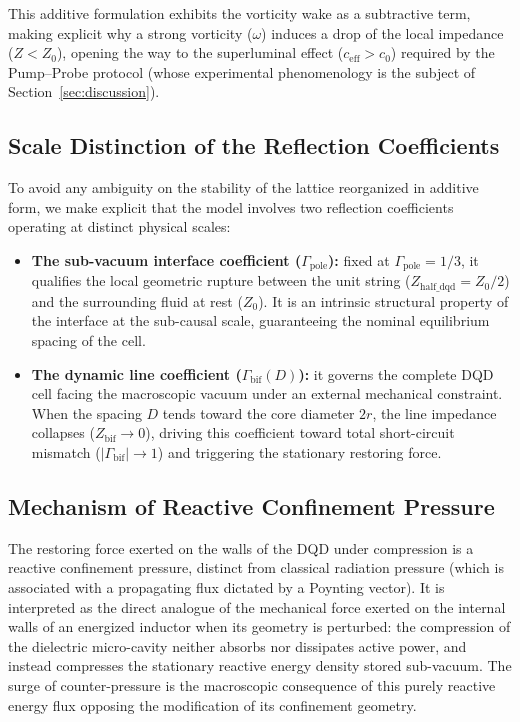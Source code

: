 \documentclass[11pt,a4paper]{article}
\theoremstyle{plain}
\theoremstyle{remark}
\begin{document}
This additive formulation exhibits the vorticity wake as a subtractive term, making explicit why a strong vorticity ($\omega$) induces a drop of the local impedance ($Z < Z_0$), opening the way to the superluminal effect ($c_{\text{eff}} > c_0$) required by the Pump--Probe protocol (whose experimental phenomenology is the subject of Section~\ref{sec:discussion}).

\subsection{Scale Distinction of the Reflection Coefficients}
To avoid any ambiguity on the stability of the lattice reorganized in additive form, we make explicit that the model involves two reflection coefficients operating at distinct physical scales:
\begin{itemize}
    \item \textbf{The sub-vacuum interface coefficient ($\Gamma_{\text{pole}}$):} fixed at $\Gamma_{\text{pole}} = 1/3$, it qualifies the local geometric rupture between the unit string ($Z_{\text{half\_dqd}} = Z_{0}/2$) and the surrounding fluid at rest ($Z_{0}$). It is an intrinsic structural property of the interface at the sub-causal scale, guaranteeing the nominal equilibrium spacing of the cell.
    \item \textbf{The dynamic line coefficient ($\Gamma_{\text{bif}}(D)$):} it governs the complete DQD cell facing the macroscopic vacuum under an external mechanical constraint. When the spacing $D$ tends toward the core diameter $2r$, the line impedance collapses ($Z_{\text{bif}} \rightarrow 0$), driving this coefficient toward total short-circuit mismatch ($|\Gamma_{\text{bif}}| \rightarrow 1$) and triggering the stationary restoring force.
\end{itemize}

\subsection{Mechanism of Reactive Confinement Pressure}
The restoring force exerted on the walls of the DQD under compression is a reactive confinement pressure, distinct from classical radiation pressure (which is associated with a propagating flux dictated by a Poynting vector). It is interpreted as the direct analogue of the mechanical force exerted on the internal walls of an energized inductor when its geometry is perturbed: the compression of the dielectric micro-cavity neither absorbs nor dissipates active power, and instead compresses the stationary reactive energy density stored sub-vacuum. The surge of counter-pressure is the macroscopic consequence of this purely reactive energy flux opposing the modification of its confinement geometry.
\end{document}
